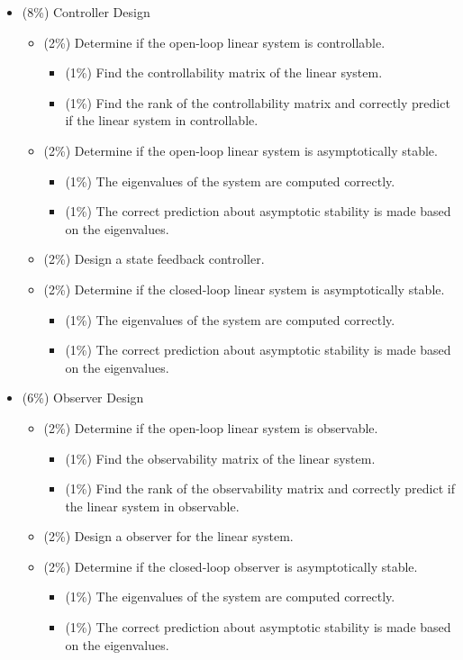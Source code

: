 \documentclass[12pt]{article}
\begin{document}
\begin{itemize}
\item (8\%) Controller Design
\begin{itemize}
\item (2\%) Determine if the open-loop linear system is controllable.
\begin{itemize}
\item (1\%) Find the controllability matrix of the linear system.
\item (1\%) Find the rank of the controllability matrix and correctly predict if the linear system in controllable.
\end{itemize}
\item (2\%) Determine if the open-loop linear system is asymptotically stable.
\begin{itemize}
\item (1\%) The eigenvalues of the system are computed correctly.
\item (1\%) The correct prediction about asymptotic stability is made based on the eigenvalues.
\end{itemize}
\item (2\%) Design a state feedback controller.
\item (2\%) Determine if the closed-loop linear system is asymptotically stable.
\begin{itemize}
\item (1\%) The eigenvalues of the system are computed correctly.
\item (1\%) The correct prediction about asymptotic stability is made based on the eigenvalues.
\end{itemize}
\end{itemize}

\item (6\%) Observer Design
\begin{itemize}
\item (2\%) Determine if the open-loop linear system is observable.
\begin{itemize}
\item (1\%) Find the observability matrix of the linear system.
\item (1\%) Find the rank of the observability matrix and correctly predict if the linear system in observable.
\end{itemize}
\item (2\%) Design a observer for the linear system.
\item (2\%) Determine if the closed-loop observer is asymptotically stable.
\begin{itemize}
\item (1\%) The eigenvalues of the system are computed correctly.
\item (1\%) The correct prediction about asymptotic stability is made based on the eigenvalues.
\end{itemize}
\end{itemize}


\end{itemize}
\end{document}
